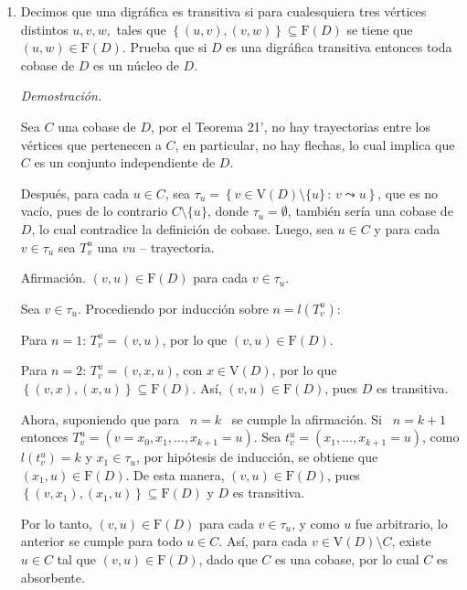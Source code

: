\documentclass[12pt, fleqn]{article}
\newcommand{\V}[1]{\mathrm{V} \! \left( #1 \right)}
\newcommand{\F}[1]{\mathrm{F} \! \left( #1 \right)}
\newcommand{\tray}[2]{$ #1 #2 $ -- trayectoria}
\begin{document}
\begin{enumerate}
		\item Decimos que una digráfica es transitiva si para cualesquiera tres vértices distintos $ u, v, w, $ tales que $ \left\lbrace (u, v), (v,w) \right\rbrace \subseteq \F{D} $ se tiene que $ (u,w) \in \F{D} $. Prueba que si $D$ es una digráfica transitiva entonces toda cobase de $D$ es un núcleo de $D$.
		
		\emph{Demostración.}

		Sea $ C $ una cobase de $D$, por el Teorema 21', no hay trayectorias entre los vértices que pertenecen a $C$, en particular, no hay flechas, lo cual implica que $C$ es un conjunto independiente de $D$. 

		Después, para cada $ u \in C $, sea $ \tau_u = \left\lbrace v \in \V{D} \setminus \{ u \} \, : \, v \leadsto u \right\rbrace $, que es no vacío, pues de lo contrario $ C \setminus \{ u \} $, donde $ \tau_u = \emptyset $, también sería una cobase de $D$, lo cual contradice la definición de cobase. Luego, sea $ u \in C $ y para cada $ v \in \tau_u $ sea $ T_v^u $ una \tray{v}{u}.

		Afirmación. $ (v, u) \in \F{D} $ para cada $ v \in \tau_u $.

		Sea $ v \in \tau_u $. Procediendo por inducción sobre $ n = l(T_v^u) $:

		Para $ n = 1 $: $ T_v^u = (v, u) $, por lo que $ (v, u) \in \F{D} $.

		Para $ n = 2 $: $ T_v^u = (v, x, u) $, con $ x \in \V{D} $, por lo que $ \left\lbrace (v, x), (x, u) \right\rbrace \subseteq \F{D} $. Así, $ (v, u) \in \F{D} $, pues $D$ es transitiva.

		Ahora, suponiendo que para \, $ n = k $ \, se cumple la afirmación. Si \, $ n = k+1 $ \, entonces $ T_v^u = (v = x_0, x_1, \ldots, x_{k+1} = u) $. Sea $ t_v^u = (x_1, \ldots, x_{k+1} = u) $, como $ l(t_v^u) = k $ y $ x_1 \in \tau_u $, por hipótesis de inducción, se obtiene que $ (x_1, u) \in \F{D} $. De esta manera, $ (v, u) \in \F{D} $, pues $ \left\lbrace (v, x_1), (x_1, u) \right\rbrace \subseteq \F{D} $ y $D$ es transitiva.

		Por lo tanto, $ (v, u) \in \F{D} $ para cada $ v \in \tau_u $, y como $ u $ fue arbitrario, lo anterior se cumple para todo $ u \in C $. Así, para cada $ v \in \V{D} \setminus C $, existe $ u \in C $ tal que $ (v, u) \in \F{D} $, dado que $C$ es una cobase, por lo cual $C$ es absorbente. 


\end{enumerate}
\end{document}
